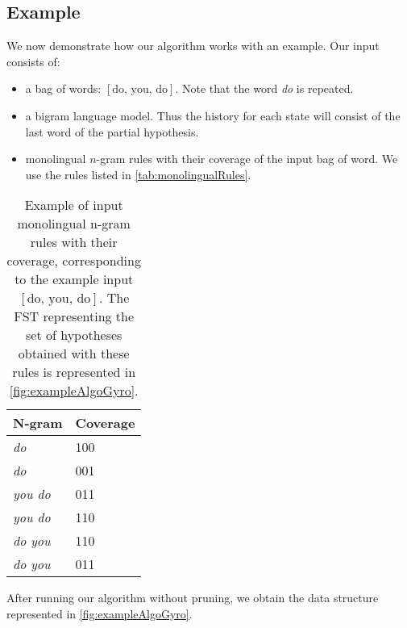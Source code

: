 \subsection{Example}

We now demonstrate how our algorithm works with an example.
Our input consists of:
%
\begin{itemize}
  \item a bag of words: $[\text{do, you, do}]$. Note that the word \emph{do} is repeated.
  \item a bigram language model. Thus the history for each state will consist of the
    last word of the partial hypothesis.
  \item monolingual $n$-gram rules with their coverage of the input bag of word. We
    use the rules listed in \autoref{tab:monolingualRules}.
\end{itemize}
%
\begin{table}
  \begin{center}
  \begin{tabular}{l|l}
    N-gram & Coverage \\
    \hline
    \emph{do} & 100 \\
    \emph{do} & 001 \\
    \emph{you do} & 011 \\
    \emph{you do} & 110 \\
    \emph{do you} & 110 \\
    \emph{do you} & 011 \\
  \end{tabular}
  \caption{Example of input monolingual n-gram rules with their coverage, corresponding
    to the example input $[\text{do, you, do}]$. The FST representing the set of hypotheses
    obtained with these rules is represented in \autoref{fig:exampleAlgoGyro}.}
  \label{tab:monolingualRules}
  \end{center}
\end{table}
%
After running our algorithm without pruning, we obtain the data structure
represented in \autoref{fig:exampleAlgoGyro}.
%
